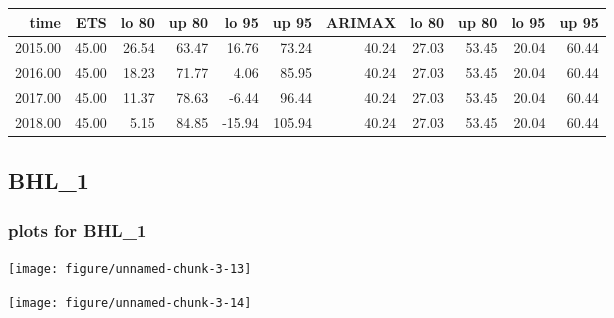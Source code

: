 \documentclass[10pt,a4paper]{article}\usepackage[]{graphicx}\usepackage[]{color}
\makeatletter
\def\maxwidth{ %
  \ifdim\Gin@nat@width>\linewidth
    \linewidth
  \else
    \Gin@nat@width
  \fi
}
\newcommand{\AaA}{\_}
\makeatother
\begin{document}
\begin{table}[ht]
\centering
\begin{tabular}{rrrrrrrrrrr}
  \hline
time & ETS  & lo 80 & up 80 & lo 95 & up 95 & ARIMAX  & lo 80 & up 80 & lo 95 & up 95 \\ 
  \hline
2015.00 & 45.00 & 26.54 & 63.47 & 16.76 & 73.24 & 40.24 & 27.03 & 53.45 & 20.04 & 60.44 \\ 
  2016.00 & 45.00 & 18.23 & 71.77 & 4.06 & 85.95 & 40.24 & 27.03 & 53.45 & 20.04 & 60.44 \\ 
  2017.00 & 45.00 & 11.37 & 78.63 & -6.44 & 96.44 & 40.24 & 27.03 & 53.45 & 20.04 & 60.44 \\ 
  2018.00 & 45.00 & 5.15 & 84.85 & -15.94 & 105.94 & 40.24 & 27.03 & 53.45 & 20.04 & 60.44 \\ 
   \hline
\end{tabular}
\end{table}

\newpage
\subsection{BHL\AaA 1}
\subsubsection{plots for BHL\AaA 1}

\texttt{[image: figure/unnamed-chunk-3-13]} 

\newpage

\texttt{[image: figure/unnamed-chunk-3-14]} 

\newpage
\end{document}
